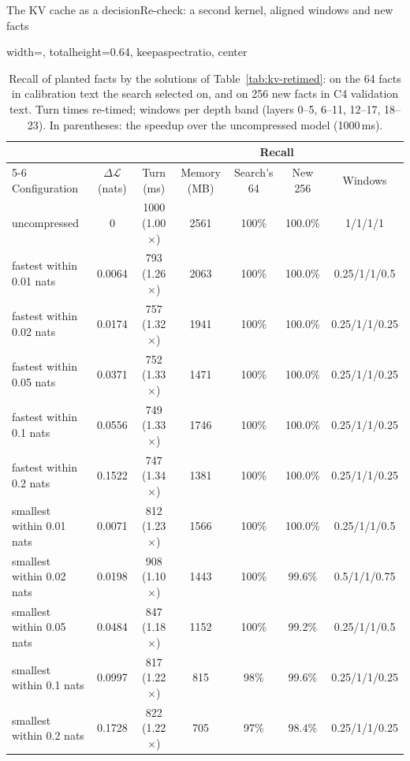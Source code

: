 \documentclass[aspectratio=169,10pt]{beamer}
\newcommand{\dloss}{\Delta\mathcal{L}}
\begin{document}
\begin{frame}{The KV cache as a decision}{Re-check: a second kernel, aligned windows and new facts}
\begin{table}
\centering
\begin{adjustbox}{width=\linewidth, totalheight=0.64\textheight, keepaspectratio, center}
\centering
\footnotesize
\setlength{\tabcolsep}{4pt}
\begin{tabular}{lcccccc}
\toprule
& & & & \multicolumn{2}{c}{Recall} & \\
\cmidrule(lr){5-6}
Configuration & $\dloss$ (nats) & Turn (ms) & Memory (MB) & Search's 64 & New 256 & Windows \\
\midrule
uncompressed                 & 0      & 1000 (1.00$\times$) & 2561 & 100\% & 100.0\% & 1/1/1/1 \\
\midrule
fastest within 0.01 nats     & 0.0064 & 793 (1.26$\times$) & 2063 & 100\% & 100.0\% & 0.25/1/1/0.5 \\
fastest within 0.02 nats     & 0.0174 & 757 (1.32$\times$) & 1941 & 100\% & 100.0\% & 0.25/1/1/0.25 \\
fastest within 0.05 nats     & 0.0371 & 752 (1.33$\times$) & 1471 & 100\% & 100.0\% & 0.25/1/1/0.25 \\
fastest within 0.1 nats      & 0.0556 & 749 (1.33$\times$) & 1746 & 100\% & 100.0\% & 0.25/1/1/0.25 \\
fastest within 0.2 nats      & 0.1522 & 747 (1.34$\times$) & 1381 & 100\% & 100.0\% & 0.25/1/1/0.25 \\
\midrule
smallest within 0.01 nats    & 0.0071 & 812 (1.23$\times$) & 1566 & 100\% & 100.0\% & 0.25/1/1/0.5 \\
smallest within 0.02 nats    & 0.0198 & 908 (1.10$\times$) & 1443 & 100\% & 99.6\%  & 0.5/1/1/0.75 \\
smallest within 0.05 nats    & 0.0484 & 847 (1.18$\times$) & 1152 & 100\% & 99.2\%  & 0.25/1/1/0.5 \\
smallest within 0.1 nats     & 0.0997 & 817 (1.22$\times$) &  815 & 98\%  & 99.6\%  & 0.25/1/1/0.25 \\
smallest within 0.2 nats     & 0.1728 & 822 (1.22$\times$) &  705 & 97\%  & 98.4\%  & 0.25/1/1/0.25 \\
\bottomrule
\end{tabular}
\end{adjustbox}
\caption{Recall of planted facts by the solutions of Table~\ref{tab:kv-retimed}: on the 64 facts in
calibration text the search selected on, and on 256 new facts in C4 validation text. Turn times re-timed;
windows per depth band (layers 0--5, 6--11, 12--17, 18--23). In parentheses: the speedup over the uncompressed model (1000\,ms).}\label{tab:kv-recall}
\end{table}
\end{frame}
\end{document}
